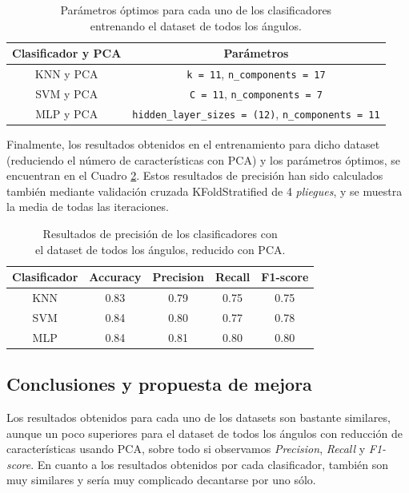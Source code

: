 \begin{table}[H]
\begin{center}
\begin{tabular}{|c|c|}
     \hline
    \textbf{Clasificador y PCA} & \textbf{Parámetros} \\
    \hline
     KNN y PCA & \verb|k = 11|, \verb|n_components = 17|\\
     SVM y PCA & \verb|C = 11|, \verb|n_components = 7|\\
     MLP y PCA & \verb|hidden_layer_sizes = (12)|, \verb|n_components = 11|\\
     \hline
 \end{tabular}
 \captionsetup{justification=centering}
\caption{Parámetros óptimos para cada uno de los clasificadores\\
entrenando el dataset de todos los ángulos.}
\label{cuadro:parametros_dataset2}
\end{center}
\end{table}

Finalmente, los resultados obtenidos en el entrenamiento para dicho dataset (reduciendo el número de características con PCA) y los parámetros óptimos, se encuentran en el Cuadro \ref{cuadro:resultados_dataset2}. Estos resultados de precisión han sido calculados también mediante validación cruzada KFoldStratified de 4 \textit{pliegues}, y se muestra la media de todas las iteraciones.\\

\begin{table}[H]
\begin{center}
\begin{tabular}{|c|c|c|c|c|}
     \hline
    \textbf{Clasificador} & \textbf{Accuracy} & \textbf{Precision} & \textbf{Recall} & \textbf{F1-score}\\
    \hline
     KNN & 0.83 & 0.79 & 0.75 & 0.75\\
     SVM & 0.84 & 0.80 & 0.77 & 0.78\\
     MLP & 0.84 & 0.81 & 0.80 & 0.80\\
     \hline
 \end{tabular}
 \captionsetup{justification=centering}
\caption{Resultados de precisión de los clasificadores con\\
el dataset de todos los ángulos, reducido con PCA.}
\label{cuadro:resultados_dataset2}
\end{center}
\end{table}

\subsection{Conclusiones y propuesta de mejora}
Los resultados obtenidos para cada uno de los datasets son bastante similares, aunque un poco superiores para el dataset de todos los ángulos con reducción de características usando PCA, sobre todo si observamos \textit{Precision}, \textit{Recall} y \textit{F1-score}. En cuanto a los resultados obtenidos por cada clasificador, también son muy similares y sería muy complicado decantarse por uno sólo.\\

